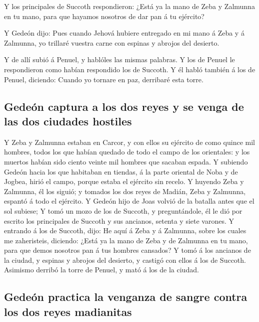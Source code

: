  Y los principales de Succoth respondieron: ¿Está ya la
mano de Zeba y Zalmunna en tu mano, para que hayamos nosotros de dar pan
á tu ejército?

 Y Gedeón dijo: Pues cuando Jehová hubiere entregado en mi
mano á Zeba y á Zalmunna, yo trillaré vuestra carne con espinas y
abrojos del desierto.

 Y de allí subió á Penuel, y hablóles las mismas palabras.
Y los de Penuel le respondieron como habían respondido los de Succoth.
 Y él habló también á los de Penuel, diciendo: Cuando yo
tornare en paz, derribaré esta torre.

\hypertarget{gedeuxf3n-captura-a-los-dos-reyes-y-se-venga-de-las-dos-ciudades-hostiles}{%
\subsection{Gedeón captura a los dos reyes y se venga de las dos
ciudades
hostiles}\label{gedeuxf3n-captura-a-los-dos-reyes-y-se-venga-de-las-dos-ciudades-hostiles}}

 Y Zeba y Zalmunna estaban en Carcor, y con ellos su
ejército de como quince mil hombres, todos los que habían quedado de
todo el campo de los orientales: y los muertos habían sido ciento veinte
mil hombres que sacaban espada.  Y subiendo Gedeón hacia
los que habitaban en tiendas, á la parte oriental de Noba y de Jogbea,
hirió el campo, porque estaba el ejército sin recelo.  Y
huyendo Zeba y Zalmunna, él los siguió; y tomados los dos reyes de
Madián, Zeba y Zalmunna, espantó á todo el ejército.  Y
Gedeón hijo de Joas volvió de la batalla antes que el sol subiese;
 Y tomó un mozo de los de Succoth, y preguntándole, él le
dió por escrito los principales de Succoth y sus ancianos, setenta y
siete varones.  Y entrando á los de Succoth, dijo: He
aquí á Zeba y á Zalmunna, sobre los cuales me zaheristeis, diciendo:
¿Está ya la mano de Zeba y de Zalmunna en tu mano, para que demos
nosotros pan á tus hombres cansados?  Y tomó á los
ancianos de la ciudad, y espinas y abrojos del desierto, y castigó con
ellos á los de Succoth.  Asimismo derribó la torre de
Penuel, y mató á los de la ciudad.

\hypertarget{gedeuxf3n-practica-la-venganza-de-sangre-contra-los-dos-reyes-madianitas}{%
\subsection{Gedeón practica la venganza de sangre contra los dos reyes
madianitas}\label{gedeuxf3n-practica-la-venganza-de-sangre-contra-los-dos-reyes-madianitas}}


